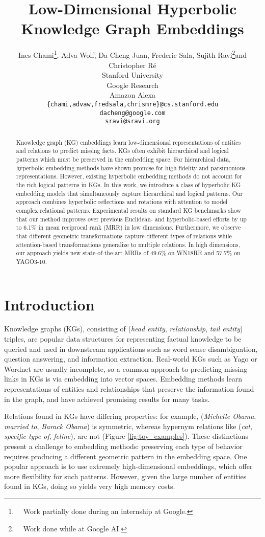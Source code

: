 \documentclass[11pt,a4paper]{article}
\title{
Low-Dimensional Hyperbolic Knowledge Graph Embeddings}
\author{Ines Chami\thanks{\ \ Work partially done during an internship at Google.}{\normalfont,} Adva Wolf{\normalfont,} Da-Cheng Juan{\normalfont,} Frederic Sala{\normalfont,} Sujith Ravi\thanks{\ \ Work done while at Google AI.}{\normalfont and} Christopher R\'e{\normalfont} \\
  Stanford University \\
  Google Research \\
  Amazon Alexa \\
  \texttt{\{chami,advaw,fredsala,chrismre\}@cs.stanford.edu}\\
  \texttt{dacheng@google.com}\\
  \texttt{sravi@sravi.org}
  }
\date{}
\begin{document}
\maketitle
\begin{abstract}
  Knowledge graph (KG) embeddings learn low-dimensional representations of entities and relations to predict missing facts. 
KGs often exhibit hierarchical and logical patterns which must be preserved in the embedding space. 
For hierarchical data, hyperbolic embedding methods have shown promise for high-fidelity and parsimonious representations. 
However, existing hyperbolic embedding methods do not account for the rich logical patterns in KGs. 
In this work, we introduce a class of hyperbolic KG embedding models that simultaneously capture hierarchical and logical patterns. 
Our approach combines hyperbolic reflections and rotations with attention to model complex relational patterns.   
Experimental results on standard KG benchmarks show that our method improves over previous Euclidean- and hyperbolic-based efforts by up to 6.1\% in mean reciprocal rank (MRR) in low dimensions. 
Furthermore, we observe that different geometric transformations capture different types of relations while attention-based transformations generalize to multiple relations. 
In high dimensions, our approach yields new state-of-the-art MRRs of 49.6\% on WN18RR and 57.7\% on YAGO3-10.  \end{abstract}

\section{Introduction}
Knowledge graphs (KGs), consisting of (\textit{head entity}, \textit{relationship}, \textit{tail entity}) triples, are popular data structures for representing factual knowledge to be queried and used in downstream applications such as word sense disambiguation, question answering, and information extraction. 
Real-world KGs such as Yago \cite{suchanek2007yago} or Wordnet \cite{miller1995wordnet} are usually incomplete, so a common approach to predicting missing links in KGs is via embedding into vector spaces.
Embedding methods learn representations of entities and relationships that preserve the information found in the graph, and have achieved promising results for many tasks. 

Relations found in KGs have differing properties: for example, (\textit{Michelle Obama}, \textit{married to}, \textit{Barack Obama}) is symmetric, whereas hypernym relations like (\textit{cat}, \textit{specific type of}, \textit{feline}), are not (Figure \ref{fig:toy_examples}). 
These distinctions present a challenge to embedding methods: preserving each type of behavior requires producing a different geometric pattern in the embedding space. 
One popular approach is to use extremely high-dimensional embeddings, which offer more flexibility for such patterns. 
However, given the large number of entities found in KGs, doing so yields very high memory costs. 
\end{document}
